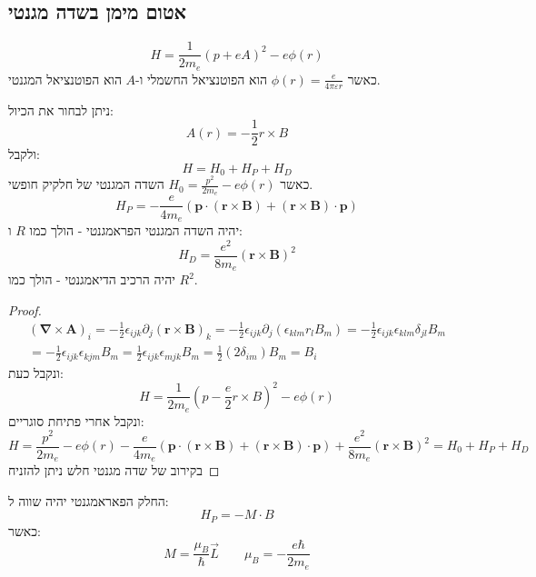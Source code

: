 \documentclass{tstextbook}
\begin{document}
\subsection{אטום מימן בשדה מגנטי}

\begin{definition}
$$H=\frac{1}{2m_{e}}\left(p+e A\right)^{2}-e\phi(r)$$
כאשר \(\phi(r)=\frac{e}{4\pi\varepsilon r}\) הוא הפוטנציאל החשמלי ו-\(A\) הוא הפוטנציאל המגנטי.

\end{definition}
\begin{proposition}
ניתן לבחור את הכיול:
$$A(r)=-\frac{1}{2}r\times B$$
ולקבל:
$$H=H_{0}+H_{P}+H_{D}$$
כאשר \(H_{0}=\frac{p^{2}}{2m_{e}}-e\phi(r)\) השדה המגנטי של חלקיק חופשי. 
$$H_{P}=-\frac{e}{4m_{e}}\left(\mathbf{p}\cdot(\mathbf{r}\times\mathbf{B})+(\mathbf{r}\times\mathbf{B})\cdot\mathbf{p}\right)$$
יהיה השדה המגנטי הפראמגנטי - הולך כמו \(R\) ו:
$$H_{D}=\frac{e^{2}}{8m_{e}}\left(\mathbf{r}\times\mathbf{B}\right)^{2}$$
יהיה הרכיב הדיאמגנטי - הולך כמו \(R^{2}\).

\end{proposition}
\begin{proof}
$$\begin{gather}\left(\mathbf{\nabla}\times\mathbf{A}\right)_{i}=-{\frac{1}{2}}\epsilon_{i j k}\partial_{j}\left(\mathbf{r}\times\mathbf{B}\right)_{k}=-{\frac{1}{2}}\epsilon_{i j k}\partial_{j}\left(\epsilon_{k l m}r_{l}B_{m}\right)=-{\frac{1}{2}}\epsilon_{i j k}\epsilon_{k l m}\delta_{j l}B_{m}\\=-\frac{1}{2}\epsilon_{i j k}\epsilon_{k j m}B_{m}=\frac{1}{2}\epsilon_{i j k}\epsilon_{m j k}B_{m}=\frac{1}{2}\left(2\delta_{i m}\right)B_{m}=B_{i} 
\end{gather}$$
ונקבל כעת:
$$H=\frac{1}{2m_{e}}\left(p-\frac{e}{2}r\times B\right)^{2}-e\phi(r)$$
ונקבל אחרי פתיחת סוגריים:
$$H=\frac{p^{2}}{2m_{e}}-e\phi(r)-\frac{e}{4m_{e}}\left(\mathbf{p}\cdot(\mathbf{r}\times\mathbf{B})+(\mathbf{r}\times\mathbf{B})\cdot\mathbf{p}\right)+\frac{e^{2}}{8m_{e}}\left(\mathbf{r}\times\mathbf{B}\right)^{2}=H_{0}+H_{P}+H_{D}$$
בקירוב של שדה מגנטי חלש ניתן להזניח

\end{proof}
\begin{proposition}
החלק הפאראמגנטי יהיה שווה ל:
$$H_{P}=-M\cdot B$$
כאשר:
$$M=\frac{\mu_{B}}{\hbar}\vec{L} \qquad \mu_{B}=-\frac{e\hbar}{2m_{e}}$$

\end{proposition}
\end{document}
